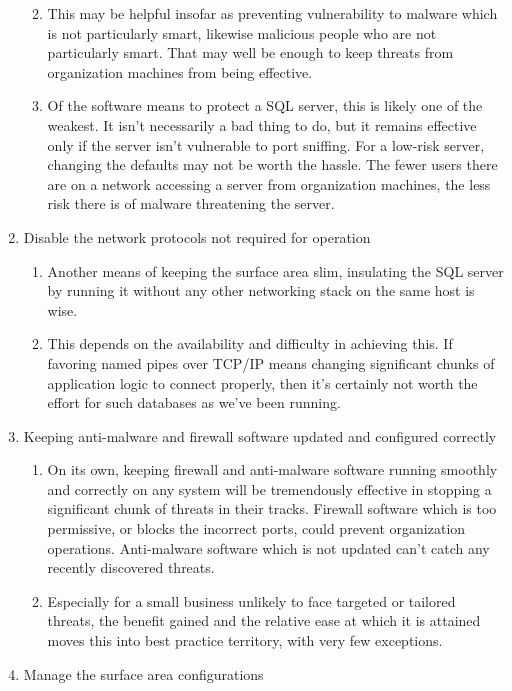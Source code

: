 \begin{enumerate}
  \begin{enumerate}
  \def\labelenumii{\arabic{enumii}.}
  \item
    This may be helpful insofar as preventing vulnerability to malware
    which is not particularly smart, likewise malicious people who are
    not particularly smart. That may well be enough to keep threats from
    organization machines from being effective.
  \item
    Of the software means to protect a SQL server, this is likely one of
    the weakest. It isn't necessarily a bad thing to do, but it remains
    effective only if the server isn't vulnerable to port sniffing. For
    a low-risk server, changing the defaults may not be worth the
    hassle. The fewer users there are on a network accessing a server
    from organization machines, the less risk there is of malware
    threatening the server.
  \end{enumerate}
\item
  Disable the network protocols not required for operation

  \begin{enumerate}
  \def\labelenumii{\arabic{enumii}.}
  \item
    Another means of keeping the surface area slim, insulating the SQL
    server by running it without any other networking stack on the same
    host is wise.
  \item
    This depends on the availability and difficulty in achieving this.
    If favoring named pipes over TCP/IP means changing significant
    chunks of application logic to connect properly, then it's certainly
    not worth the effort for such databases as we've been running.
  \end{enumerate}
\item
  Keeping anti-malware and firewall software updated and configured
  correctly

  \begin{enumerate}
  \def\labelenumii{\arabic{enumii}.}
  \item
    On its own, keeping firewall and anti-malware software running
    smoothly and correctly on any system will be tremendously effective
    in stopping a significant chunk of threats in their tracks. Firewall
    software which is too permissive, or blocks the incorrect ports,
    could prevent organization operations. Anti-malware software which
    is not updated can't catch any recently discovered threats.
  \item
    Especially for a small business unlikely to face targeted or
    tailored threats, the benefit gained and the relative ease at which
    it is attained moves this into best practice territory, with very
    few exceptions.
  \end{enumerate}
\item
  Manage the surface area configurations


\end{enumerate}

